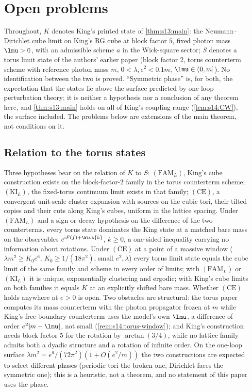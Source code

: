 \section{Open problems}

Throughout, $K$ denotes King's printed state of \cref{thm:s13:main}: the Neumann--Dirichlet cube limit on King's RG cube at block factor $5$, fixed photon mass $\lmu>0$, with an admissible scheme $a$ in the Wick-square sector; $S$ denotes a torus limit state of the authors' earlier paper \cite{SymPhase} (block factor $2$, torus counterterm scheme with reference photon mass $m$, $0<\lambda,e^2<0.1m$, $\lmu\in(0,m]$). No identification between the two is proved. ``Symmetric phase'' is, for both, the expectation that the states lie above the surface predicted by one-loop perturbation theory; it is neither a hypothesis nor a conclusion of any theorem here, and \cref{thm:s13:main} holds on all of King's coupling range (\cref{lem:s14:CW}), the surface included. The problems below are extensions of the main theorem, not conditions on it.

\subsection{Relation to the torus states}

Three hypotheses bear on the relation of $K$ to $S$: $(\mathrm{FAM}_L)$, King's cube construction exists on the block-factor-$2$ family in the torus counterterm scheme; $(\mathrm{KI}_L)$, the fixed-torus continuum limit exists in that family; $(\mathrm{CE})$, a convergent unit-scale cluster expansion with sources on the cubic tori, their tilted copies and their cuts along King's cubes, uniform in the lattice spacing. Under $(\mathrm{FAM}_L)$ and a sign or decay hypothesis on the difference of the two counterterms, every torus state dominates the King state at a matched bare mass on the observables $e^{\mathrm iF(f)+\Wick{k}}$, $k\ge0$, a one-sided inequality carrying no information about rotations. Under $(\mathrm{CE})$ at a point of a massive window ($\lambda m^2\ge K_0e^6$, $K_0\ge1/(18\pi^2)$, small $e^2,\lambda$) every torus limit state equals the cube limit of the same family and scheme in every order of limits; with $(\mathrm{FAM}_L)$ or $(\mathrm{KI}_L)$ it is unique, exponentially clustering and ergodic; with King's cube limits on both families it equals $K$ at an explicitly shifted bare mass. Whether $(\mathrm{CE})$ holds anywhere at $e>0$ is open. Two obstacles are structural: the torus paper computes its mass counterterm with the photon propagator frozen at $m$ while King's free-boundary counterterm uses the model's own $\lmu$, a difference of order $e^2|m-\lmu|$, not small (\cref{rem:s14:torus-window}); and King's construction needs block factor $5$ for the rotation by $\arctan(3/4)$, while no lattice family admits both a dyadic structure and a rotation of infinite order. On the one-loop surface $\lambda m^2=e^6/(72\pi^2)(1+O(e^2/m))$ the two constructions are expected to select different phases (periodic tori the broken one, Dirichlet faces the symmetric one); this is a heuristic, not a theorem, and no statement of this paper uses the phase.

